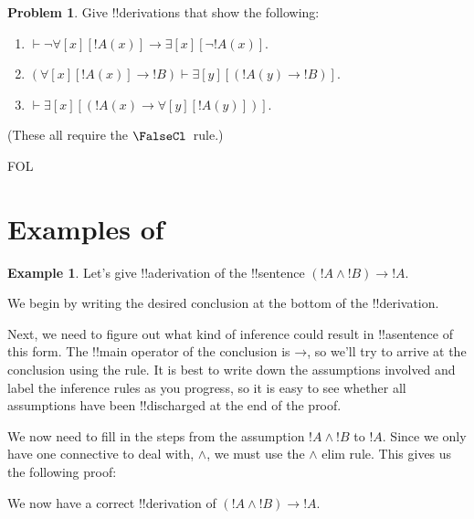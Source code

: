 \documentclass[10pt,a4paper]{article}
\theoremstyle{plain}
\theoremstyle{definition}
\newtheorem{ex}[thm]{Example}
\newtheorem{prob}{Problem}[section]
\theoremstyle{remark}
\newcommand*{\olfileid}[3]{}
\newcommand*{\olsection}[1]{\section*{#1}}
\providecommand{\AxiomC}[1]{}
\providecommand{\UnaryInfC}[1]{}
\providecommand{\RightLabel}[1]{}
\newenvironment{prooftree}{}{}
\providecommand{\lif}{\mathbin{\rightarrow}}
\providecommand{\lforall}{\mathord{\forall}}
\providecommand{\lexists}{\mathord{\exists}}
\providecommand{\Proves}{\mathrel{\vdash}}
\providecommand{\iftag}[1]{#1}
\providecommand{\Elim}[1]{}
\providecommand{\Intro}[1]{}
\providecommand{\Discharge}{\mathrm{Dis}}
\providecommand{\Intro}{\mathrm{I}}
\begin{document}
\begin{prob}
Give !!{derivation}s that show the following:
\begin{enumerate}
\item $\Proves \lnot\lforall[x][!A(x)] \lif \lexists[x][\lnot!A(x)]$.
\item $(\lforall[x][!A(x)] \lif !B) \Proves \lexists[y][(!A(y) \lif !B)]$.
\item $\Proves \lexists[x][(!A(x) \lif \lforall[y][!A(y)])]$.
\end{enumerate}
(These all require the $\FalseCl$~rule.)
\end{prob}





\iftag{FOL}
      {\olfileid{fol}{ntd}{pro}}
      {\olfileid{pl}{ntd}{pro}}

\olsection{Examples of }

\begin{ex}
Let's give !!a{derivation} of the !!{sentence} $(!A \land !B) \lif !A$.

We begin by writing the desired conclusion at the bottom of the 
!!{derivation}.
\begin{prooftree}
\AxiomC{}
\UnaryInfC{$(!A\land !B) \lif !A$}
\end{prooftree}

Next, we need to figure out what kind of inference could result in
!!a{sentence} of this form. The !!{main operator} of the
conclusion is $\lif$, so we'll try to arrive at the
conclusion using the \Intro{\lif} rule. It is best to write down
the assumptions involved and label the inference rules as you
progress, so it is easy to see whether all assumptions have been
!!{discharged} at the end of the proof.
\begin{prooftree}
\AxiomC{$\Discharge{!A \land !B}{1}$}
\DischargeRule{\Intro{\lif}}{1} 
\UnaryInfC{$(!A\land !B) \lif !A$}
\end{prooftree}

We now need to fill in the steps from the assumption $!A \land !B$ to $!A$.
Since we only have one connective to deal with, $\land$, we must
use the $\land$ elim rule. This gives us the following proof:
\begin{prooftree}
\AxiomC{$\Discharge{!A \land !B}{1}$}
\RightLabel{\Elim{\land}}
\UnaryInfC{$!A$}
\DischargeRule{\Intro{\lif}}{1} 
\UnaryInfC{$(!A\land !B) \lif !A$}
\end{prooftree}
We now have a correct !!{derivation} of $(!A \land
!B) \lif !A$.
\end{ex}
\end{document}
